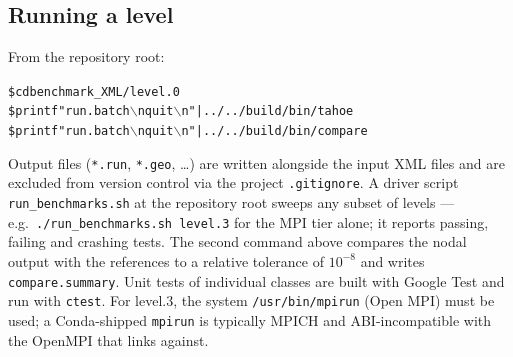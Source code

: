 \subsection{Running a level}
From the repository root:
\begin{center}
\begin{minipage}{0.85\linewidth}
\begin{alltt}
\$ cd benchmark_XML/level.0
\$ printf "run.batch\(\backslash\)nquit\(\backslash\)n" | ../../build/bin/tahoe
\$ printf "run.batch\(\backslash\)nquit\(\backslash\)n" | ../../build/bin/compare
\end{alltt}
\end{minipage}
\end{center}
Output files (\texttt{*.run}, \texttt{*.geo}, \ldots) are written
alongside the input XML files and are excluded from version control
via the project \texttt{.gitignore}.  A driver script
\texttt{run\_benchmarks.sh} at the repository root sweeps any subset of
levels --- e.g.\ \texttt{./run\_benchmarks.sh level.3} for the MPI
tier alone; it reports passing, failing and crashing tests.  The second command above
compares the nodal output with the references to a relative tolerance of $10^{-8}$ and writes
\texttt{compare.summary}.  Unit tests of individual classes are built with Google Test and run
with \texttt{ctest}.  For level.3, the system \texttt{/usr/bin/mpirun} (Open MPI)
must be used; a Conda-shipped \texttt{mpirun} is typically MPICH and
ABI-incompatible with the OpenMPI that \tahoe links against.

